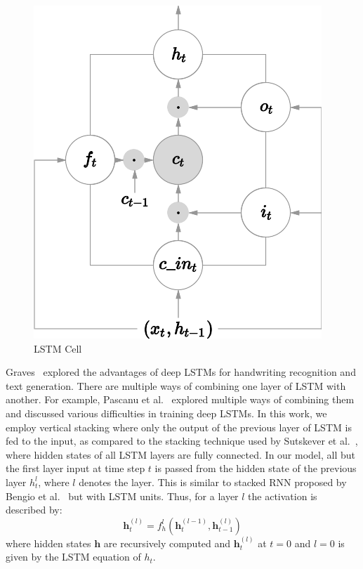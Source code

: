 \begin{figure}
    \centering
    \includegraphics[scale=0.5]{figures/paraphrase/lstm.png}
    \caption{LSTM Cell}
    \label{fig:lstmcell}
\end{figure}
 
 
Graves~\cite{graves2013generating} explored the advantages of deep LSTMs for handwriting recognition and text generation. There are multiple ways of combining one layer of LSTM with another. For example, Pascanu et al.~\cite{pascanu2013construct} explored multiple ways of combining them and discussed various difficulties in training deep LSTMs. In this work, we employ vertical stacking where only the output of the previous layer of LSTM is fed to the input, as compared to
the stacking technique used by Sutskever et al.~\cite{SutskeverVL14}, where hidden states of all LSTM layers are fully connected. In our model, all but the first layer input at time step $t$ is passed from the hidden state of the previous layer $h_{t}^{l}$, where $l$ denotes the layer. This is similar to stacked RNN proposed by Bengio et al.~\cite{Bengio94} but with LSTM units. Thus, for a layer $l$ the activation is described by:
$$
\bm{h}_{t}^{(l)} = f_{h}^{l}(\bm{h}_{t}^{(l-1)}, \bm{h}_{t-1}^{(l)})
$$
where hidden states $\bm{h}$ are recursively computed and $\bm{h}_{t}^{(l)} $ at $t=0$ and $l=0$ is given by the LSTM equation of $h_{t}$.
 
